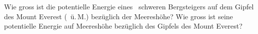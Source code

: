 Wie gross ist die potentielle Energie eines \mbsO\ schweren Bergsteigers auf dem Gipfel des Mount Everest (\hevO\ ü.\,M.) bezüglich der Meereshöhe? Wie gross ist seine potentielle Energie auf Meereshöhe bezüglich des Gipfels des Mount Everest?
